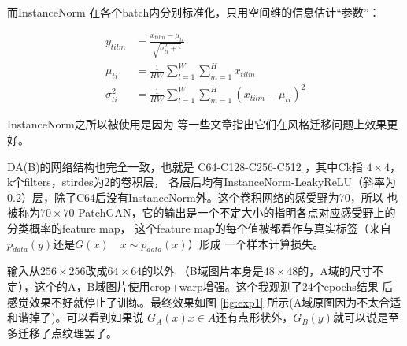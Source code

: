 \documentclass[twocolumn,11pt]{ctexart}
\begin{document}
而InstanceNorm \cite{vedaldi2016instance}在各个batch内分别标准化，只用空间维的信息估计“参数”：

\begin{align*}
    y_{tilm} &= \frac{x_{tilm} - \mu_{ti}}{\sqrt{\sigma_{ti}^2 + \epsilon}} \\
    \mu_{ti} &= \frac{1}{HW}\sum_{l=1}^W\sum_{m=1}^H x_{tilm} \\
    \sigma_{ti}^2 &= \frac{1}{HW}\sum_{l=1}^W\sum_{m=1}^H (x_{tilm} - \mu_{ti})^2
\end{align*}

InstanceNorm之所以被使用是因为 \cite{vedaldi2016instance}等一些文章指出它们在风格迁移问题上效果更好。

DA(B)的网络结构也完全一致，也就是 C64-C128-C256-C512 ，其中Ck指 $4\times 4$，k个filters，stirdes为2的卷积层，
各层后均有InstanceNorm-LeakyReLU（斜率为0.2）层，除了C64后没有InstanceNorm外。这个卷积网络的感受野为70，所以
也被称为$70\times 70$ PatchGAN，它的输出是一个不定大小的指明各点对应感受野上的分类概率的feature map，
这个feature map的每个值被都看作与真实标签（来自$p_{data}(y)$还是$G(x) \quad x\sim p_{data}(x)$）形成
一个样本计算损失。

输入从$256 \times 256$改成$64\times64$的以外
（B域图片本身是$48\times 48$的，A域的尺寸不定），这个的A，B域图片使用crop+warp增强。这个我观测了24个epochs结果
后感觉效果不好就停止了训练。最终效果如图 \ref{fig:exp1} 所示(A域原图因为不太合适和谐掉了)。可以看到如果说
$G_A(x) x\in A$还有点形状外，$G_B(y)$就可以说是至多迁移了点纹理罢了。
\end{document}
